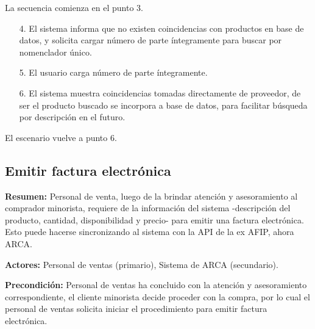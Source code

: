 La secuencia comienza en el punto 3.

\begin{enumerate}
	\item[4.] El sistema informa que no existen coincidencias con productos en base de datos,
	y solicita cargar número de parte íntegramente para buscar por nomenclador único.
	\item[5.] El usuario carga número de parte íntegramente.
	\item[6.] El sistema muestra coincidencias tomadas directamente de proveedor,
	de ser el producto buscado se incorpora a base de datos,
	para facilitar búsqueda por descripción en el futuro.
\end{enumerate}

El escenario vuelve a punto 6.

\subsection{Emitir factura electrónica}

\textbf{Resumen:}
Personal de venta, 
luego de la brindar atención y asesoramiento al comprador minorista,
requiere de la información del sistema
-descripción del producto, cantidad, disponibilidad y precio-
para emitir una factura electrónica.
Esto puede hacerse sincronizando al sistema con la API de la ex AFIP,
ahora ARCA.

\textbf{Actores:} Personal de ventas (primario), Sistema de ARCA (secundario).

\textbf{Precondición:} 
Personal de ventas ha concluido con la atención y asesoramiento correspondiente,
el cliente minorista decide proceder con la compra,
por lo cual el personal de ventas solicita iniciar el procedimiento para emitir factura electrónica.

